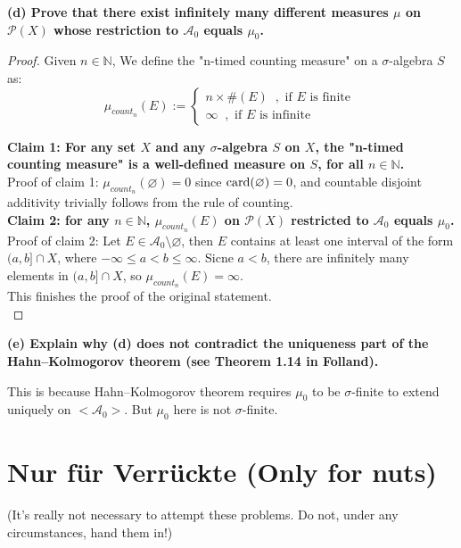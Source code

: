 \documentclass[lang=cn,11pt]{elegantbook}
\begin{document}
\noindent \textbf{(d) Prove that there exist infinitely many different measures \(\mu\) on \(\mathcal{P}(X)\) whose restriction to \(\mathcal{A}_0\) equals \(\mu_0\).}
\begin{proof}
    Given $n \in \mathbb{N}$, We define the "n-timed counting measure" on a $\sigma$-algebra $S$ as:
$$
    \mu_{count_n}(E) := \begin{cases}
        n\times  \#(E) \;\;, \text{ if }  E \text{ is finite }  \\
        \infty \;\; ,\text{ if }  E \text{ is infinite }
    \end{cases}
 $$

 \noindent \textbf{Claim 1: For any set $X$ and any $\sigma$-algebra $S$ on $X$, the "n-timed counting measure" is a well-defined measure on $S$, for all $n \in \mathbb{N}$.}\\
Proof of claim 1: $\mu_{count_n}(\varnothing) = 0$ since $\operatorname{card}(\varnothing)  =0$, and countable disjoint additivity trivially follows from the rule of counting.\\
\noindent \textbf{Claim 2: for any $n \in \mathbb{N}$, $\mu_{count_n}(E) $ on \(\mathcal{P}(X)\) restricted to \(\mathcal{A}_0\) equals \(\mu_0\).}
Proof of claim 2: Let $E \in \mathcal{A}_0 \setminus \varnothing$, then $E$ contains at least one interval of the form \((a, b] \cap X\), where \(-\infty \leq a < b \leq \infty\). Sicne $a < b$, there are infinitely many elements in \((a, b] \cap X\), so $\mu_{count_n}(E) = \infty$.\\
\noindent This finishes the proof of the original statement.\\
\end{proof}

\noindent \textbf{(e) Explain why (d) does not contradict the uniqueness part of the Hahn–Kolmogorov theorem (see Theorem 1.14 in Folland).}\\
\begin{solution}
    \noindent This is because Hahn–Kolmogorov theorem requires $\mu_0$ to be $\sigma$-finite to extend uniquely on $<\mathcal{A}_0>$. But $\mu_0$ here is not $\sigma$-finite.\\
\end{solution}






\section*{Nur für Verrückte (Only for nuts)}
(It’s really not necessary to attempt these problems. Do not, under any circumstances, hand them in!)
\end{document}
